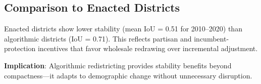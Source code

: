 \subsection{Comparison to Enacted Districts}

Enacted districts show lower stability (mean IoU = 0.51 for 2010--2020) than algorithmic districts (IoU = 0.71). This reflects partisan and incumbent-protection incentives that favor wholesale redrawing over incremental adjustment.

\textbf{Implication}: Algorithmic redistricting provides stability benefits beyond compactness—it adapts to demographic change without unnecessary disruption.
